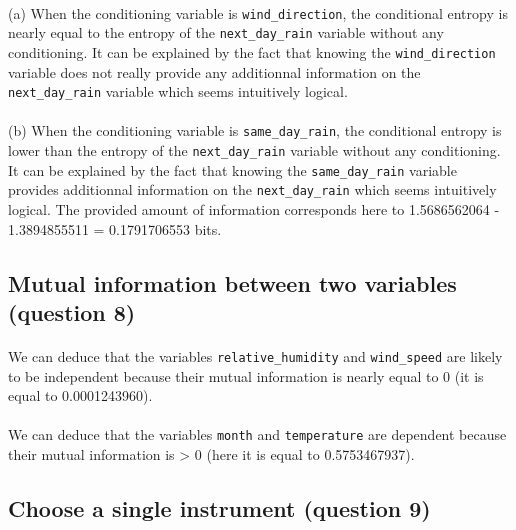 \documentclass[a4paper, 11pt, oneside]{article}
\begin{document}
\paragraph{}(a) When the conditioning variable is \texttt{wind\_direction}, the conditional entropy is nearly equal to the entropy of the \texttt{next\_day\_rain} variable without any conditioning.
It can be explained by the fact that knowing the \texttt{wind\_direction} variable does not really provide any additionnal information on the \texttt{next\_day\_rain} variable which seems intuitively logical.

\paragraph{}(b) When the conditioning variable is \texttt{same\_day\_rain}, the conditional entropy is lower than the entropy of the \texttt{next\_day\_rain} variable without any conditioning.
It can be explained by the fact that knowing the \texttt{same\_day\_rain} variable provides additionnal information on the \texttt{next\_day\_rain} which seems intuitively logical. The provided amount of information corresponds here to 1.5686562064 - 1.3894855511 = 0.1791706553 bits.

\subsection{Mutual information between two variables (question 8)} 

\paragraph{}We can deduce that the variables \texttt{relative\_humidity} and \texttt{wind\_speed} are likely to be independent because their mutual information is nearly equal to 0 (it is equal to 0.0001243960). 

\paragraph{}We can deduce that the variables \texttt{month} and \texttt{temperature} are dependent because their mutual information is > 0 (here it is equal to 0.5753467937).

\subsection{Choose a single instrument (question 9)}
\end{document}
